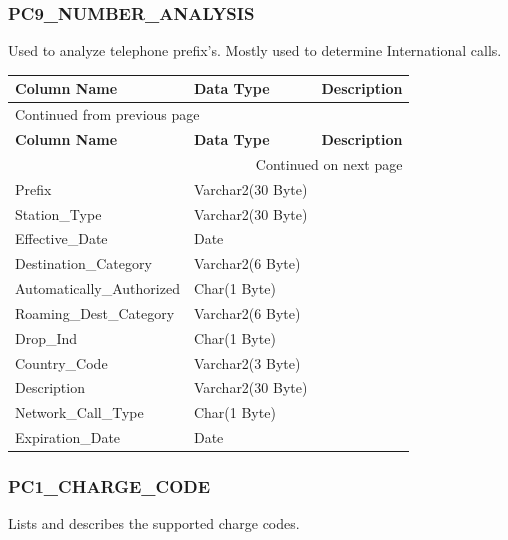 \documentclass[12pt,twoside]{article}
\begin{document}
\normalsize
\normalsize

\subsubsection{PC9\_NUMBER\_ANALYSIS}
\label{sec:orgheadline61}
Used to analyze telephone prefix's. Mostly used to determine
International calls.
\footnotesize

\begin{longtable}{l|l|l}
\hline
\textbf{Column Name} & \textbf{Data Type} & \textbf{Description}\\
\hline
\endfirsthead
\multicolumn{3}{l}{Continued from previous page} \\
\hline

\textbf{Column Name} & \textbf{Data Type} & \textbf{Description} \\

\hline
\endhead
\hline\multicolumn{3}{r}{Continued on next page} \\
\endfoot
\endlastfoot
\hline
Prefix & Varchar2(30 Byte) & \\
Station\_Type & Varchar2(30 Byte) & \\
Effective\_Date & Date & \\
Destination\_Category & Varchar2(6 Byte) & \\
Automatically\_Authorized & Char(1 Byte) & \\
Roaming\_Dest\_Category & Varchar2(6 Byte) & \\
Drop\_Ind & Char(1 Byte) & \\
Country\_Code & Varchar2(3 Byte) & \\
Description & Varchar2(30 Byte) & \\
Network\_Call\_Type & Char(1 Byte) & \\
Expiration\_Date & Date & \\
\hline
\end{longtable}

\normalsize
\subsubsection{PC1\_CHARGE\_CODE}
\label{sec:orgheadline62}
Lists and describes the supported charge codes.
\footnotesize
\end{document}
